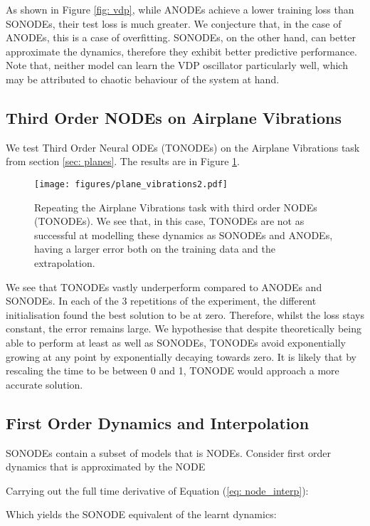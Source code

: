 \documentclass{article}
\theoremstyle{remark}
\theoremstyle{definition}
\begin{document}
As shown in Figure \ref{fig: vdp}, while ANODEs achieve a lower training loss than SONODEs, their test loss is much greater. We conjecture that, in the case of ANODEs, this is a case of overfitting. SONODEs, on the other hand, can better approximate the dynamics, therefore they exhibit better predictive performance. Note that, neither model can learn the VDP oscillator particularly well, which may be attributed to chaotic behaviour of the system at hand. 


\subsection{Third Order NODEs on Airplane Vibrations}
\label{app: plane_part_2}
We test Third Order Neural ODEs (TONODEs) on the Airplane Vibrations task from section \ref{sec: planes}. The results are in Figure \ref{fig: plane_part_2}.


\begin{figure}[t]
    \centering
    \texttt{[image: figures/plane\_vibrations2.pdf]}
    \caption{Repeating the Airplane Vibrations task with third order NODEs (TONODEs). We see that, in this case, TONODEs are not as successful at modelling these dynamics as SONODEs and ANODEs, having a larger error both on the training data and the extrapolation.}
    \label{fig: plane_part_2}
\end{figure}

We see that TONODEs vastly underperform compared to ANODEs and SONODEs. In each of the 3 repetitions of the experiment, the different initialisation found the best solution to be at zero. Therefore, whilst the loss stays constant, the error remains large. We hypothesise that despite theoretically being able to perform at least as well as SONODEs, TONODEs avoid exponentially growing at any point by exponentially decaying towards zero. It is likely that by rescaling the time to be between 0 and 1, TONODE would approach a more accurate solution.

\subsection{First Order Dynamics and Interpolation}

SONODEs contain a subset of models that is NODEs. Consider first order dynamics that is approximated by the NODE

Carrying out the full time derivative of Equation (\ref{eq: node_interp}):


Which yields the SONODE equivalent of the learnt dynamics:
\end{document}
